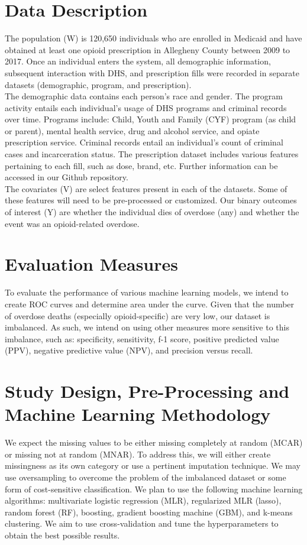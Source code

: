 \documentclass[twoside,10.5pt]{article}
\begin{document}
\section{Data Description}
The population (W) is 120,650 individuals who are enrolled in Medicaid and have obtained at least one opioid prescription in Allegheny County between 2009 to 2017. Once an individual enters the system, all demographic information, subsequent interaction with DHS, and prescription fills were recorded in separate datasets (demographic, program, and prescription).\\

The demographic data contains each person's race and gender. The program activity entails each individual's usage of DHS programs and criminal records over time. Programs include: Child, Youth and Family (CYF) program (as child or parent), mental health service, drug and alcohol service, and opiate prescription service. Criminal records entail an individual's count of criminal cases and incarceration status. The prescription dataset includes various features pertaining to each fill, such as dose, brand, etc. Further information can be accessed in our Github repository.\\

The covariates (V) are select features present in each of the datasets. Some of these features will need to be pre-processed or customized. Our binary outcomes of interest (Y) are whether the individual dies of overdose (any) and whether the event was an opioid-related overdose. 

\section{Evaluation Measures}
To evaluate the performance of various machine learning models, we intend to create ROC curves and determine area under the curve. Given that the number of overdose deaths (especially opioid-specific) are very low, our dataset is imbalanced. As such, we intend on using other measures more sensitive to this imbalance, such as: specificity, sensitivity, f-1 score, positive predicted value (PPV), negative predictive value (NPV), and precision versus recall.   

\section{Study Design, Pre-Processing and Machine Learning Methodology}
We expect the missing values to be either missing completely at random (MCAR) or missing not at random (MNAR). To address this, we will either create missingness as its own category or use a pertinent imputation technique. We may use oversampling to overcome the problem of the imbalanced dataset or some form of cost-sensitive classification. We plan to use the following machine learning algorithms: multivariate logistic regression (MLR), regularized MLR (lasso), random forest (RF), boosting, gradient boosting machine (GBM), and k-means clustering. We aim to use cross-validation and tune the hyperparameters to obtain the best possible results. 
  
\end{document}
